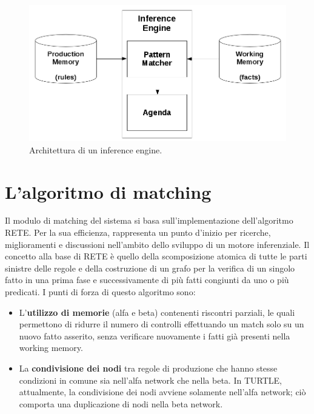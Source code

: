 \begin{figure}[!ht]
  \centering
  \includegraphics[scale=0.35]{pictures/engine}
  \caption{Architettura di un inference engine.}
\end{figure}


\section{L'algoritmo di matching}
Il modulo di matching del sistema si basa sull'implementazione dell'algoritmo RETE. Per la sua efficienza, rappresenta un punto d'inizio per ricerche, miglioramenti e discussioni nell'ambito dello sviluppo di un motore inferenziale. Il concetto alla base di RETE è quello della scomposizione atomica di tutte le parti sinistre delle regole e della costruzione di un grafo per la verifica di un singolo fatto in una prima fase e successivamente di più fatti congiunti da uno o più predicati.
I punti di forza di questo algoritmo sono:
\begin{itemize}
\item L'\textbf{utilizzo di memorie} (alfa e beta) contenenti riscontri parziali, le quali permettono di ridurre il numero di controlli effettuando un match solo su un nuovo fatto asserito, senza verificare nuovamente i fatti già presenti nella working memory.
\item La \textbf{condivisione dei nodi} tra regole di produzione che hanno stesse condizioni in comune sia nell'alfa network che nella beta. In TURTLE, attualmente, la condivisione dei nodi avviene solamente nell'alfa network; ciò comporta una duplicazione di nodi nella beta network. 
\end{itemize}


